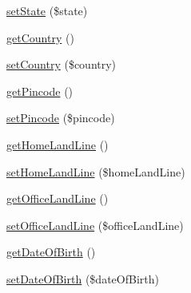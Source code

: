 \begin{DoxyCompactItemize}
\item 
\hyperlink{class_profile_a94042b70768a686decc42594ef36bbd6}{set\+State} (\$state)
\item 
\hyperlink{class_profile_ad92da151b159c2bdbb64cbe7a4790d1a}{get\+Country} ()
\item 
\hyperlink{class_profile_af3301ca05d64b858e6da89d51a4650c1}{set\+Country} (\$country)
\item 
\hyperlink{class_profile_a3900683cb510fd3935a81f1d2463600e}{get\+Pincode} ()
\item 
\hyperlink{class_profile_aa814618e1acb5b5f85d64d0aa62572da}{set\+Pincode} (\$pincode)
\item 
\hyperlink{class_profile_af9952b3e2d2e325e63a18c5cb00751e8}{get\+Home\+Land\+Line} ()
\item 
\hyperlink{class_profile_adb4407f8f016593dcc95a3f769ef0205}{set\+Home\+Land\+Line} (\$home\+Land\+Line)
\item 
\hyperlink{class_profile_aaf9e438f7b393148ec25c37b931300d6}{get\+Office\+Land\+Line} ()
\item 
\hyperlink{class_profile_a284010631016d354dbd62d081de4f8ac}{set\+Office\+Land\+Line} (\$office\+Land\+Line)
\item 
\hyperlink{class_profile_a8979f3ee352559717e887417999a7d6d}{get\+Date\+Of\+Birth} ()
\item 
\hyperlink{class_profile_a8e1761ae85226dfb70d3b23912488372}{set\+Date\+Of\+Birth} (\$date\+Of\+Birth)
\end{DoxyCompactItemize}
